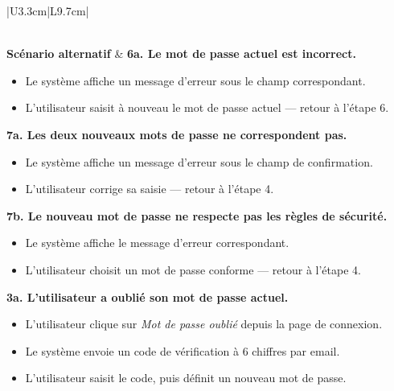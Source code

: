 \documentclass[a4paper,12pt]{report}
\begin{document}
\begin{longtable}{|U{3.3cm}|L{9.7cm}|}
\begin{enumerate}
\end{enumerate} \\
\hline
\textbf{Scénario alternatif} &
\textbf{6a. Le mot de passe actuel est incorrect.}
\begin{itemize}
    \item[6.1] Le système affiche un message d'erreur sous le champ
    correspondant.
    \item[6.2] L'utilisateur saisit à nouveau le mot de passe actuel —
    retour à l'étape 6.
\end{itemize}
\textbf{7a. Les deux nouveaux mots de passe ne correspondent pas.}
\begin{itemize}
    \item[7.1] Le système affiche un message d'erreur sous le champ de
    confirmation.
    \item[7.2] L'utilisateur corrige sa saisie — retour à l'étape 4.
\end{itemize}
\textbf{7b. Le nouveau mot de passe ne respecte pas les règles de
sécurité.}
\begin{itemize}
    \item[7.1] Le système affiche le message d'erreur correspondant.
    \item[7.2] L'utilisateur choisit un mot de passe conforme — retour
    à l'étape 4.
\end{itemize}
\textbf{3a. L'utilisateur a oublié son mot de passe actuel.}
\begin{itemize}
    \item[3.1] L'utilisateur clique sur \textit{Mot de passe oublié}
    depuis la page de connexion.
    \item[3.2] Le système envoie un code de vérification à 6 chiffres
    par email.
    \item[3.3] L'utilisateur saisit le code, puis définit un nouveau
    mot de passe.
\end{itemize} 
\end{longtable}
 
\end{document}
